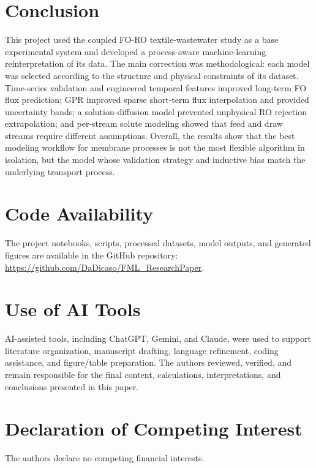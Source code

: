 \documentclass[journal, onecolumn, 12pt]{IEEEtran}
\begin{document}
\section{Conclusion}
This project used the coupled FO-RO textile-wastewater study as a base experimental system and developed a process-aware machine-learning reinterpretation of its data. The main correction was methodological: each model was selected according to the structure and physical constraints of its dataset. Time-series validation and engineered temporal features improved long-term FO flux prediction; GPR improved sparse short-term flux interpolation and provided uncertainty bands; a solution-diffusion model prevented unphysical RO rejection extrapolation; and per-stream solute modeling showed that feed and draw streams require different assumptions. Overall, the results show that the best modeling workflow for membrane processes is not the most flexible algorithm in isolation, but the model whose validation strategy and inductive bias match the underlying transport process.

\section*{Code Availability}
The project notebooks, scripts, processed datasets, model outputs, and generated figures are available in the GitHub repository: \url{https://github.com/DaDicaso/FML_ResearchPaper}.

\section*{Use of AI Tools}
AI-assisted tools, including ChatGPT, Gemini, and Claude, were used to support literature organization, manuscript drafting, language refinement, coding assistance, and figure/table preparation. The authors reviewed, verified, and remain responsible for the final content, calculations, interpretations, and conclusions presented in this paper.

\section*{Declaration of Competing Interest}
The authors declare no competing financial interests.
\end{document}
